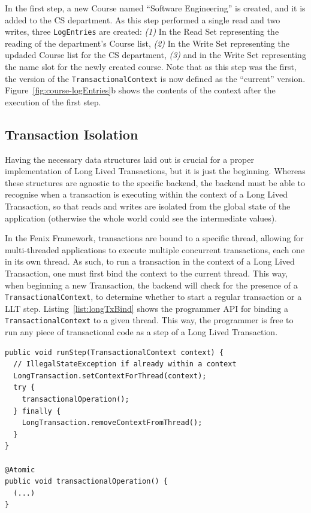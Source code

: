 In the first step, a new Course named ``Software Engineering'' is
created, and it is added to the CS department. As this step performed
a single read and two writes, three \texttt{LogEntries} are created:
{\it (1)} In the Read Set representing the reading of the department's
Course list, {\it (2)} In the Write Set representing the updaded
Course list for the CS department, {\it (3)} and in the Write Set
representing the name slot for the newly created course.  Note that as
this step was the first, the version of the
\texttt{TransactionalContext} is now defined as the ``current''
version. Figure~\ref{fig:course-logEntries}b shows the contents of the
context after the execution of the first step.

\subsection{Transaction Isolation}

Having the necessary data structures laid out is crucial for a proper
implementation of Long Lived Transactions, but it is just the
beginning. Whereas these structures are agnostic to the specific
backend, the backend must be able to recognise when a transaction is
executing within the context of a Long Lived Transaction, so that
reads and writes are isolated from the global state of the application
(otherwise the whole world could see the intermediate values).

In the Fenix Framework, transactions are bound to a specific thread,
allowing for multi-threaded applications to execute multiple
concurrent transactions, each one in its own thread. As such, to run a
transaction in the context of a Long Lived Transaction, one must first
bind the context to the current thread. This way, when beginning a new
Transaction, the backend will check for the presence of a
\texttt{TransactionalContext}, to determine whether to start a regular
transaction or a LLT step. Listing~\ref{list:longTxBind} shows the
programmer API for binding a \texttt{TransactionalContext} to a given
thread. This way, the programmer is free to run any piece of
transactional code as a step of a Long Lived Transaction.

\begin{lstlisting}[caption={Example of TransactionalContext usage},
  label={list:longTxBind},float]
public void runStep(TransactionalContext context) {
  // IllegalStateException if already within a context
  LongTransaction.setContextForThread(context);
  try {
    transactionalOperation();
  } finally {
    LongTransaction.removeContextFromThread();
  }
}

@Atomic
public void transactionalOperation() {
  (...)
}
\end{lstlisting}

